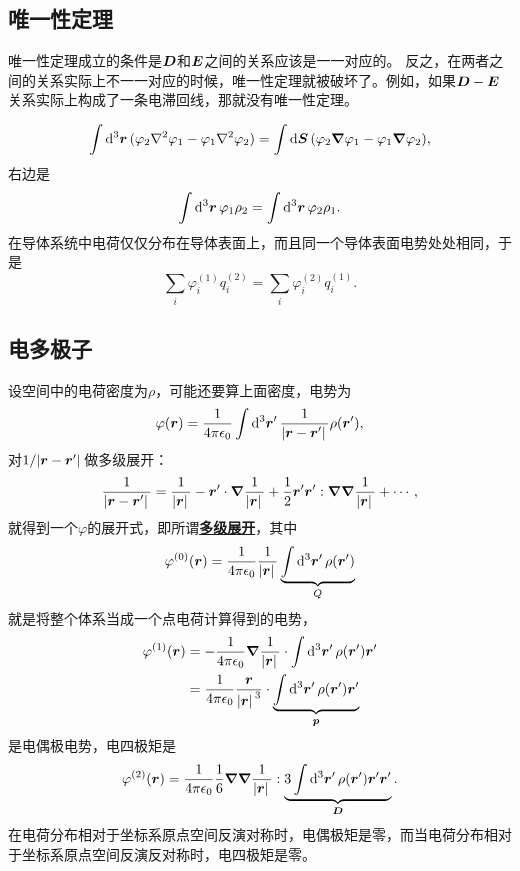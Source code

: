\documentclass[UTF8, a4paper]{ctexart}
\newcommand*{\concept}[1]{\underline{\textbf{#1}}}
\begin{document}
\subsection{唯一性定理}

唯一性定理成立的条件是$\vb*{D}$和$\vb*{E}$之间的关系应该是一一对应的。
反之，在两者之间的关系实际上不一一对应的时候，唯一性定理就被破坏了。例如，如果$\vb*{D}-\vb*{E}$关系实际上构成了一条电滞回线，那就没有唯一性定理。


\[
    \int \dd[3]{\vb*{r}} (\varphi_2 \laplacian{\varphi_1} - \varphi_1 \laplacian{\varphi_2}) = \int \dd{\vb*{S}} (\varphi_2 \grad{\varphi_1} - \varphi_1 \grad{\varphi_2}),
\]
右边是
\begin{equation}
    \int \dd[3]{\vb*{r}} \varphi_1 \rho_2 = \int \dd[3]{\vb*{r}} \varphi_2 \rho_1.
\end{equation}
在导体系统中电荷仅仅分布在导体表面上，而且同一个导体表面电势处处相同，于是
\begin{equation}
    \sum_i \varphi_i^{(1)} q_i^{(2)} = \sum_i \varphi_i^{(2)} q_i^{(1)}.
\end{equation}

\subsection{电多极子}

设空间中的电荷密度为$\rho$，可能还要算上面密度，电势为
\[
    \varphi(\vb*{r}) = \frac{1}{4\pi \epsilon_0} \int \dd[3]{\vb*{r}'} \frac{1}{\abs*{\vb*{r} - \vb*{r}'}} \rho(\vb*{r}'),
\]
对$1/\abs*{\vb*{r}-\vb*{r}'}$做多级展开：
\[
    \frac{1}{\abs*{\vb*{r}-\vb*{r}'}} = \frac{1}{\abs*{\vb*{r}}} - \vb*{r}' \cdot \grad{\frac{1}{\abs*{\vb*{r}}}} + \frac{1}{2} \vb*{r}' \vb*{r}' : \grad{\grad{\frac{1}{\abs*{\vb*{r}}}}} + \cdots,
\]
就得到一个$\varphi$的展开式，即所谓\concept{多级展开}，其中
\begin{equation}
    \varphi^{(0)}(\vb*{r}) = \frac{1}{4\pi \epsilon_0} \frac{1}{\abs*{\vb*{r}}} \underbrace{\int \dd[3]{\vb*{r}'} \rho(\vb*{r}')}_{Q}
\end{equation}
就是将整个体系当成一个点电荷计算得到的电势，
\begin{equation}
    \begin{aligned}
        \varphi^{(1)}(\vb*{r}) &= - \frac{1}{4\pi \epsilon_0} \grad{\frac{1}{\abs*{\vb*{r}}}} \cdot \int \dd[3]{\vb*{r}'} \rho(\vb*{r}') \vb*{r}' \\
        &= \frac{1}{4\pi \epsilon_0} \frac{\vb*{r}}{\abs*{\vb*{r}}^3} \cdot \underbrace{\int \dd[3]{\vb*{r}'} \rho(\vb*{r}') \vb*{r}'}_{\vb*{p}}
    \end{aligned}
\end{equation}
是电偶极电势，电四极矩是
\begin{equation}
    \varphi^{(2)}(\vb*{r}) = \frac{1}{4 \pi \epsilon_0} \frac{1}{6} \grad{\grad{\frac{1}{\abs*{\vb*{r}}}}} : \underbrace{3 \int \dd[3]{\vb*{r}'} \rho(\vb*{r}') \vb*{r}' \vb*{r}' }_{\vb*{D}}.
\end{equation}
在电荷分布相对于坐标系原点空间反演对称时，电偶极矩是零，而当电荷分布相对于坐标系原点空间反演反对称时，电四极矩是零。
\end{document}
